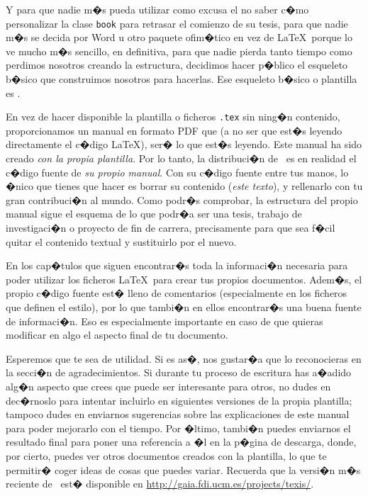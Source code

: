 Y para que nadie m�s pueda utilizar como excusa el no saber c�mo
personalizar la clase \texttt{book} para retrasar el comienzo de su
tesis, para que nadie m�s se decida por Word u otro paquete ofim�tico
en vez de \LaTeX\ porque lo ve mucho m�s sencillo, en definitiva, para
que nadie pierda tanto tiempo como perdimos nosotros creando la
estructura, decidimos hacer p�blico el esqueleto b�sico que
construimos nosotros para hacerlas. Ese esqueleto b�sico o plantilla
es \texis.

En vez de hacer disponible la plantilla o ficheros \texttt{.tex} sin
ning�n contenido, proporcionamos un manual en formato PDF que (a no
ser que est�s leyendo directamente el c�digo \LaTeX), ser� lo que
est�s leyendo. Este manual ha sido creado \emph{con la propia
  plantilla}. Por lo tanto, la distribuci�n de \texis\ es en
realidad el c�digo fuente de \emph{su propio manual}. Con su c�digo
fuente entre tus manos, lo �nico que tienes que hacer es borrar su
contenido (\emph{este texto}), y rellenarlo con tu gran contribuci�n
al mundo.  Como podr�s comprobar, la estructura del propio manual
sigue el esquema de lo que podr�a ser una tesis, trabajo de
investigaci�n o proyecto de fin de carrera, precisamente para que sea
f�cil quitar el contenido textual y sustituirlo por el nuevo.

En los cap�tulos que siguen encontrar�s toda la informaci�n necesaria
para poder utilizar los ficheros \LaTeX\ para crear tus propios
documentos. Adem�s, el propio c�digo fuente est� lleno de comentarios
(especialmente en los ficheros que definen el estilo), por lo que
tambi�n en ellos encontrar�s una buena fuente de informaci�n. Eso es
especialmente importante en caso de que quieras modificar en algo el
aspecto final de tu documento.

Esperemos que te sea de utilidad. Si es as�, nos gustar�a que lo
reconocieras en la secci�n de agradecimientos. Si durante tu proceso
de escritura has a�adido alg�n aspecto que crees que puede ser
interesante para otros, no dudes en dec�rnoslo para intentar incluirlo
en siguientes versiones de la propia plantilla; tampoco dudes en
enviarnos sugerencias sobre las explicaciones de este manual para
poder mejorarlo con el tiempo. Por �ltimo, tambi�n puedes enviarnos el
resultado final para poner una referencia a �l en la p�gina de
descarga, donde, por cierto, puedes ver otros documentos creados con
la plantilla, lo que te permitir� coger ideas de cosas que puedes
variar. Recuerda que la versi�n m�s reciente de \texis\ est�
disponible en \url{http://gaia.fdi.ucm.es/projects/texis/}.

